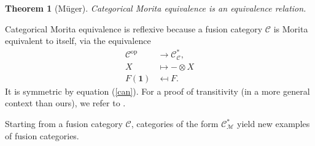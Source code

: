 \documentclass[a4paper, 10pt]{book}
\newtheorem{theorem}{Theorem}[chapter]
\theoremstyle{definition}
\numberwithin{equation}{chapter}
\newcommand\ot{\otimes}
\newcommand\op{^{\text{op}}}
\newcommand\M{\mathcal{M}}
\newcommand\C{\mathcal C}
\newcommand{\ra}\rightarrow
\newcommand\one{\mathbf{1}}
\begin{document}
\begin{theorem}[M\"uger]
Categorical Morita equivalence is an equivalence relation.
\end{theorem}
Categorical Morita equivalence is reflexive because a fusion category $\C$ is Morita equivalent to itself, via the equivalence \begin{align*}
	\C\op &\ra \C^*_\C,\\
	X&\mapsto -\ot X\\
	F(\one)&\mapsfrom F.
\end{align*}  It is symmetric by equation (\ref{can}). For a proof of transitivity (in a more general context than ours), we refer to \cite[Proposition 7.12.18]{EGNO}.

Starting from a fusion category $\C$, categories of the form $\C^*_\M$ yield new examples of fusion categories.
\end{document}
